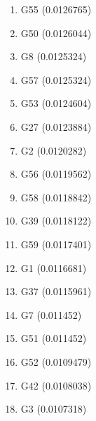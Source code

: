 \begin{enumerate}
\item G55 (0.0126765)
\item G50 (0.0126044)
\item G8 (0.0125324)
\item G57 (0.0125324)
\item G53 (0.0124604)
\item G27 (0.0123884)
\item G2 (0.0120282)
\item G56 (0.0119562)
\item G58 (0.0118842)
\item G39 (0.0118122)
\item G59 (0.0117401)
\item G1 (0.0116681)
\item G37 (0.0115961)
\item G7 (0.011452)
\item G51 (0.011452)
\item G52 (0.0109479)
\item G42 (0.0108038)
\item G3 (0.0107318)
\end{enumerate}
